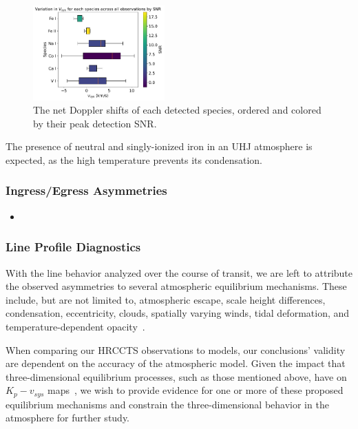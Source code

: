 \documentclass[twocolumn]{aastex631}
\begin{document}
        \begin{figure}[]\label{fig:combined-species-snr} 
            \includegraphics[width=0.45\textwidth]{plots/combined-species-snr/KELT-20b.inverted-transmission-better.CombinedSpeciesSNRs.pdf}
            \caption{The net Doppler shifts of each detected species, ordered and colored by their peak detection SNR.}
            
        \end{figure}

            The presence of neutral and singly-ionized iron in an UHJ atmosphere is expected, as the high temperature prevents its condensation.
        
            \subsubsection{Ingress/Egress Asymmetries}\label{subsubsec:Ingress/Egress Asymmetries}
                \begin{itemize}
                    \item 
                \end{itemize}
                
            \subsubsection{Line Profile Diagnostics}\label{subsubsec:Wind Profile Diagnostics}
                With the line behavior analyzed over the course of transit, we are left to attribute the observed asymmetries to several atmospheric equilibrium mechanisms. These include, but are not limited to, atmospheric escape, scale height differences, condensation, eccentricity, clouds, spatially varying winds, tidal deformation, and temperature-dependent opacity~\citep{Savel2023}. 

                When comparing our HRCCTS observations to models, our conclusions' validity are dependent on the accuracy of the atmospheric model. Given the impact that three-dimensional equilibrium processes, such as those mentioned above, have on $K_p-v_{sys}$ maps~\citep{Wardenier2021}, we wish to provide evidence for one or more of these proposed equilibrium mechanisms and constrain the three-dimensional behavior in the atmosphere for further study.
\end{document}
